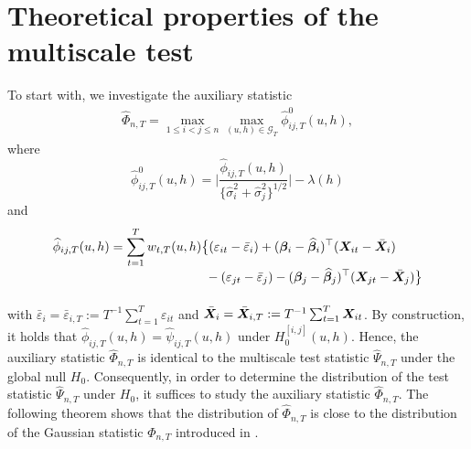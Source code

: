 \documentclass[a4paper,12pt]{article}
\makeatletter
\renewcommand{\eqref}[1]{\tagform@{\ref{#1}}}
\makeatother
\begin{document}
\section{Theoretical properties of the multiscale test}\label{sec:theo}



To start with, we investigate the auxiliary statistic
\begin{align}\label{eq:Phi_hat}
\widehat{\Phi}_{n,T} = \max_{1 \le i < j \le n}  \max_{(u, h) \in \mathcal{G}_T} \widehat{\phi}^0_{ij, T}(u, h),
\end{align}
where
\begin{equation*}%
\widehat{\phi}^0_{ij, T}(u, h) =\bigg| \frac{\widehat{\phi}_{ij, T}(u, h)} {\{ \widehat{\sigma}_i^2 + \widehat{\sigma}_j^2 \}^{1/2}} \bigg| - \lambda(h)
\end{equation*}
and
\begin{align*}
\widehat{\phi}_{ij, T}(u, h) 
 & = \sum_{t=1}^T w_{t,T}(u, h) \big\{ (\varepsilon_{it} - \bar{\varepsilon}_i) + (\bfbeta_i - \widehat{\bfbeta}_i)^\top (\X_{it} - \bar{\X}_{i}) \\[-0.4cm]
 & \phantom{= \sum_{t=1}^T w_{t,T}(u, h) \big\{} - (\varepsilon_{jt} - \bar{\varepsilon}_j) -  (\bfbeta_j - \widehat{\bfbeta}_j)^\top (\X_{jt} - \bar{\X}_{j}) \big\}
\end{align*}
with $\bar{\varepsilon}_i = \bar{\varepsilon}_{i,T} := T^{-1} \sum_{t=1}^T \varepsilon_{it}$ and $\bar{\boldsymbol{X}}_{i} =  \bar{\boldsymbol{X}}_{i, T} := T^{-1}\sum_{t=1}^T  \boldsymbol{X}_{it}$. By construction, it holds that $\widehat{\phi}_{ij, T}(u, h) = \widehat{\psi}_{ij, T}(u, h)$ under $H_0^{[i, j]}(u, h)$. Hence, the auxiliary statistic $\widehat{\Phi}_{n,T}$ is identical to the multiscale test statistic $\widehat{\Psi}_{n,T}$ under the global null $H_0$. Consequently, in order to determine the distribution of the test statistic $\widehat{\Psi}_{n,T}$ under $H_0$, it suffices to study the auxiliary statistic $\widehat{\Phi}_{n,T}$. The following theorem shows that the distribution of $\widehat{\Phi}_{n,T}$ is close to the distribution of the Gaussian statistic $\Phi_{n,T}$ introduced in \eqref{eq:Phi}. 


\end{document}
